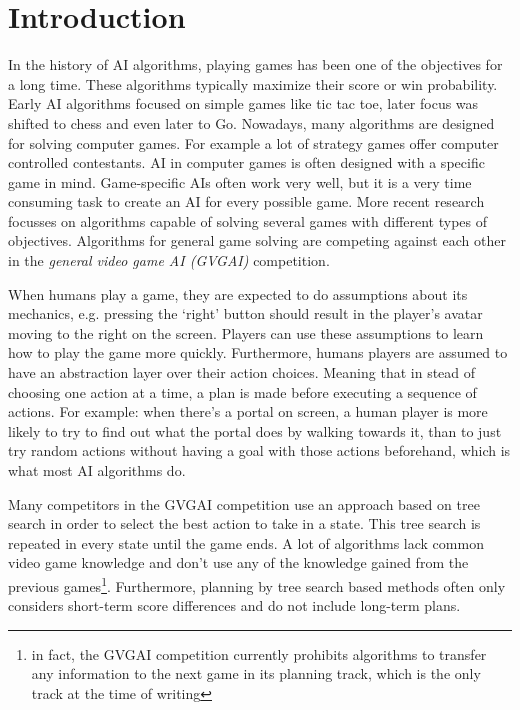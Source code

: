 \section{Introduction}
\label{sec:introduction}
In the history of AI algorithms, playing games has been one of the objectives
for a long time. These algorithms typically maximize their score or win
probability. Early AI algorithms focused on simple games like tic tac toe,
later focus was shifted to chess and even later to Go. Nowadays, many
algorithms are designed for solving computer games. For example a lot of
strategy games offer computer controlled contestants. AI in computer games is
often designed with a specific game in mind. 
Game-specific AIs often work very well, but it is a very time consuming
task to create an AI for every possible game. More recent research focusses
on algorithms capable of solving several games with different types of
objectives. Algorithms for general game solving are competing against each other
in the \emph{general video game AI (GVGAI)} competition\cite{perez2014}. 

When humans play a game, they are expected to do assumptions about
its mechanics, e.g. pressing the `right' button should result in the player's
avatar moving to the right on the screen. Players can use these assumptions to
learn how to play the game more quickly. Furthermore, humans players are assumed
to have an abstraction layer over their action choices. Meaning that in stead of
choosing one action at a time, a plan is made before executing a sequence of
actions. For example: when there's a portal on screen, a human player is more
likely to try to find out what the portal does by walking towards it, than to
just try random actions without having a goal with those actions beforehand,
which is what most AI algorithms do.

Many competitors in the GVGAI competition use an approach based on tree
search in order to select the best action to take in a state. This tree search
is repeated in every state until the game ends. A lot of algorithms lack
common video game knowledge and don't use any of the knowledge gained from the
previous games\footnote{in fact, the GVGAI competition currently prohibits algorithms to
transfer any information to the next game in its planning track, which is the
only track at the time of writing}. Furthermore, planning by tree search based
methods often only considers short-term score differences and do not include
long-term plans.

